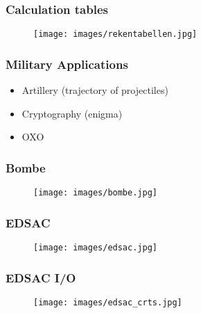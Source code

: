 \documentclass[aspectratio=43]{uva-inf-presentation}
\begin{document}

\begin{frame}
\frametitle{Calculation tables}

\begin{figure}
\texttt{[image: images/rekentabellen.jpg]}
\end{figure}

\end{frame}


\begin{frame}
\frametitle{Military Applications}

\begin{itemize}
\item Artillery (trajectory of projectiles)
\item Cryptography (enigma)
\item OXO
\end{itemize}

\end{frame}


\begin{frame}
\frametitle{Bombe}

\begin{figure}
\texttt{[image: images/bombe.jpg]}
\end{figure}

\end{frame}


\begin{frame}
\frametitle{EDSAC}

\begin{figure}
\texttt{[image: images/edsac.jpg]}
\end{figure}

\end{frame}


\begin{frame}
\frametitle{EDSAC I/O}

\begin{figure}
\texttt{[image: images/edsac\_crts.jpg]}
\end{figure}

\end{frame}
\end{document}
